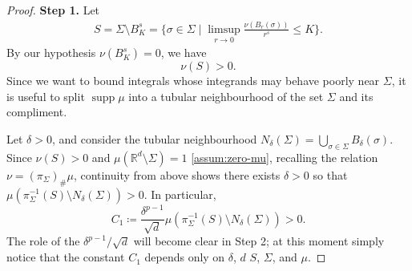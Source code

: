 \documentclass[preprint, reqno]{amsart}
\DeclareMathOperator*{\supp}{supp}
\theoremstyle{definition}
\numberwithin{equation}{section}
\begin{document}
\begin{proof}
  \textbf{Step 1.} Let
  \begin{align*}
    S = \Sigma \setminus B_K^s =\{\sigma \in \Sigma \mid \limsup_{r
    \to 0}
    \frac{\nu(B_r(\sigma))}{r^s} \le K\}.
  \end{align*}
  By our hypothesis $\nu(B_K^s) = 0$, we have
  \[
    \nu(S) > 0.
  \]
  Since we want to bound integrals whose integrands may behave poorly
  near $\Sigma$, it is useful to split $\supp \mu$ into a tubular
  neighbourhood of the set $\Sigma$ and its compliment.

  Let $\delta > 0$, and consider the tubular neighbourhood
  $N_{\delta}(\Sigma) = \bigcup_{\sigma \in
    \Sigma}B_{\delta}(\sigma)$. Since $\nu(S) > 0$ and $\mu({ \mathbb
    R^d \setminus}\Sigma) = 1$ \eqref{assum:zero-mu}, recalling the
  relation $\nu=(\pi_\Sigma)_\# \mu$, continuity from above shows
  there exists $\delta>0$ so that $\mu(\pi_\Sigma^{-1}(S) \setminus
  N_\delta(\Sigma)) > 0$. In particular,
  \[
    C_1 \coloneqq \frac{\delta^{p-1}}{\sqrt{d}}
    \mu(\pi_{\Sigma}^{-1}(S) \setminus N_{\delta}(\Sigma)) > 0.
  \]
  The role of the $\delta^{p-1}/\sqrt d$ will become clear in Step 2;
  at this moment simply notice that the constant $C_1$ depends only on
  $\delta$, $d$ $S$, $\Sigma$, and $\mu$.


\end{proof}
\end{document}
